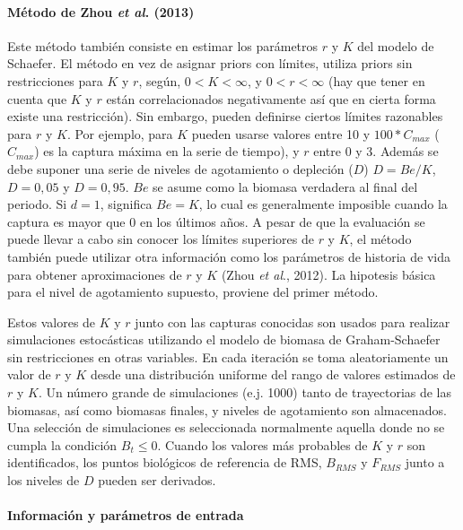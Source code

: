 \documentclass[
  spanish,
]{article}
\begin{document}
\hypertarget{muxe9todo-de-zhou-et-al.-2013}{%
\paragraph{\texorpdfstring{Método de Zhou \emph{et al}.
(2013)}{Método de Zhou et al. (2013)}}\label{muxe9todo-de-zhou-et-al.-2013}}

\quad

Este método también consiste en estimar los parámetros \(r\) y \(K\) del
modelo de Schaefer. El método en vez de asignar priors con límites,
utiliza priors sin restricciones para \(K\) y \(r\), según,
\(0 < K < \infty\), y \(0 < r < \infty\) (hay que tener en cuenta que
\(K\) y \(r\) están correlacionados negativamente así que en cierta
forma existe una restricción). Sin embargo, pueden definirse ciertos
límites razonables para \(r\) y \(K\). Por ejemplo, para \(K\) pueden
usarse valores entre 10 y \(100*C_{max}\) (\(C_{max}\)) es la captura
máxima en la serie de tiempo), y \(r\) entre 0 y 3. Además se debe
suponer una serie de niveles de agotamiento o depleción (\(D\))
\(D=Be/K\), \(D=0,05\) y \(D=0,95\). \(Be\) se asume como la biomasa
verdadera al final del periodo. Si \(d=1\), significa \(Be=K\), lo cual
es generalmente imposible cuando la captura es mayor que 0 en los
últimos años. A pesar de que la evaluación se puede llevar a cabo sin
conocer los límites superiores de \(r\) y \(K\), el método también puede
utilizar otra información como los parámetros de historia de vida para
obtener aproximaciones de \(r\) y \(K\) (Zhou \emph{et al}., 2012). La
hipotesis básica para el nivel de agotamiento supuesto, proviene del
primer método.

Estos valores de \(K\) y \(r\) junto con las capturas conocidas son
usados para realizar simulaciones estocásticas utilizando el modelo de
biomasa de Graham-Schaefer sin restricciones en otras variables. En cada
iteración se toma aleatoriamente un valor de \(r\) y \(K\) desde una
distribución uniforme del rango de valores estimados de \(r\) y \(K\).
Un número grande de simulaciones (e.j. 1000) tanto de trayectorias de
las biomasas, así como biomasas finales, y niveles de agotamiento son
almacenados. Una selección de simulaciones es seleccionada normalmente
aquella donde no se cumpla la condición \(B_t\leq 0\). Cuando los
valores más probables de \(K\) y \(r\) son identificados, los puntos
biológicos de referencia de RMS, \(B_{RMS}\) y \(F_{RMS}\) junto a los
niveles de \(D\) pueden ser derivados.

\hypertarget{informaciuxf3n-y-paruxe1metros-de-entrada}{%
\paragraph{Información y parámetros de
entrada}\label{informaciuxf3n-y-paruxe1metros-de-entrada}}
\end{document}
